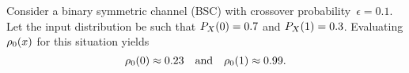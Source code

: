 \begin{example}
  \label{ex:bsccap}
  Consider a binary symmetric channel (BSC) with crossover
  probability~$\epsilon=0.1$. Let the input distribution be such that $P_X(0) =
  0.7$ and $P_X(1) = 0.3$. Evaluating ${\rho_0}(x)$ for this situation yields
  \begin{equation*}
    {\rho_0}(0) \approx 0.23 \quad\text{and} \quad
    {\rho_0}(1) \approx 0.99.
  \end{equation*}
\end{example}
\medbreak
%
%

